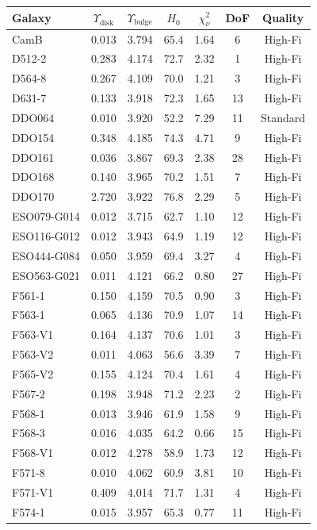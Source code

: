 \begin{longtable}{lcccccc}
\toprule
Galaxy & $\Upsilon_{\text{disk}}$ & $\Upsilon_{\text{bulge}}$ & $H_0$ & $\chi^2_\nu$ & DoF & Quality \\
\midrule
CamB & 0.013 & 3.794 & 65.4 & 1.64 & 6 & High-Fi \\
D512-2 & 0.283 & 4.174 & 72.7 & 2.32 & 1 & High-Fi \\
D564-8 & 0.267 & 4.109 & 70.0 & 1.21 & 3 & High-Fi \\
D631-7 & 0.133 & 3.918 & 72.3 & 1.65 & 13 & High-Fi \\
DDO064 & 0.010 & 3.920 & 52.2 & 7.29 & 11 & Standard \\
DDO154 & 0.348 & 4.185 & 74.3 & 4.71 & 9 & High-Fi \\
DDO161 & 0.036 & 3.867 & 69.3 & 2.38 & 28 & High-Fi \\
DDO168 & 0.140 & 3.965 & 70.2 & 1.51 & 7 & High-Fi \\
DDO170 & 2.720 & 3.922 & 76.8 & 2.29 & 5 & High-Fi \\
ESO079-G014 & 0.012 & 3.715 & 62.7 & 1.10 & 12 & High-Fi \\
ESO116-G012 & 0.012 & 3.943 & 64.9 & 1.19 & 12 & High-Fi \\
ESO444-G084 & 0.050 & 3.959 & 69.4 & 3.27 & 4 & High-Fi \\
ESO563-G021 & 0.011 & 4.121 & 66.2 & 0.80 & 27 & High-Fi \\
F561-1 & 0.150 & 4.159 & 70.5 & 0.90 & 3 & High-Fi \\
F563-1 & 0.065 & 4.136 & 70.9 & 1.07 & 14 & High-Fi \\
F563-V1 & 0.164 & 4.137 & 70.6 & 1.01 & 3 & High-Fi \\
F563-V2 & 0.011 & 4.063 & 56.6 & 3.39 & 7 & High-Fi \\
F565-V2 & 0.155 & 4.124 & 70.4 & 1.61 & 4 & High-Fi \\
F567-2 & 0.198 & 3.948 & 71.2 & 2.23 & 2 & High-Fi \\
F568-1 & 0.013 & 3.946 & 61.9 & 1.58 & 9 & High-Fi \\
F568-3 & 0.016 & 4.035 & 64.2 & 0.66 & 15 & High-Fi \\
F568-V1 & 0.012 & 4.278 & 58.9 & 1.73 & 12 & High-Fi \\
F571-8 & 0.010 & 4.062 & 60.9 & 3.81 & 10 & High-Fi \\
F571-V1 & 0.409 & 4.014 & 71.7 & 1.31 & 4 & High-Fi \\
F574-1 & 0.015 & 3.957 & 65.3 & 0.77 & 11 & High-Fi \\

\end{longtable}
